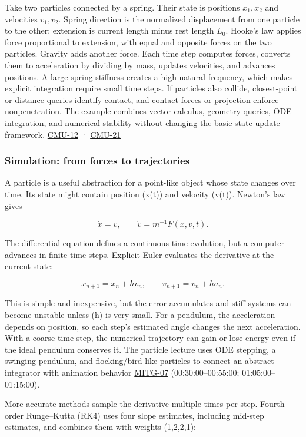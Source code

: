 Take two particles connected by a spring. Their state is positions \(x_1,x_2\) and velocities \(v_1,v_2\). Spring direction is the normalized displacement from one particle to the other; extension is current length minus rest length \(L_0\). Hooke's law applies force proportional to extension, with equal and opposite forces on the two particles. Gravity adds another force. Each time step computes forces, converts them to acceleration by dividing by mass, updates velocities, and advances positions. A large spring stiffness creates a high natural frequency, which makes explicit integration require small time steps. If particles also collide, closest-point or distance queries identify contact, and contact forces or projection enforce nonpenetration. The example combines vector calculus, geometry queries, ODE integration, and numerical stability without changing the basic state-update framework. \hyperref[04-visual-computing-ii-ch036]{CMU-12} · \hyperref[04-visual-computing-ii-ch036]{CMU-21}

\subsubsection{Simulation: from forces to trajectories}\label{simulation-from-forces-to-trajectories}

A particle is a useful abstraction for a point-like object whose state changes over time. Its state might contain position (x(t)) and velocity (v(t)). Newton's law gives

\[
\dot{x}=v,\qquad \dot{v}=m^{-1}F(x,v,t).
\]

The differential equation defines a continuous-time evolution, but a computer advances in finite time steps. Explicit Euler evaluates the derivative at the current state:

\[
x_{n+1}=x_n+h v_n,\qquad v_{n+1}=v_n+h a_n.
\]

This is simple and inexpensive, but the error accumulates and stiff systems can become unstable unless (h) is very small. For a pendulum, the acceleration depends on position, so each step's estimated angle changes the next acceleration. With a coarse time step, the numerical trajectory can gain or lose energy even if the ideal pendulum conserves it. The particle lecture uses ODE stepping, a swinging pendulum, and flocking/bird-like particles to connect an abstract integrator with animation behavior \hyperref[04-visual-computing-ii-ch036]{MITG-07} (00:30:00--00:55:00; 01:05:00--01:15:00).

More accurate methods sample the derivative multiple times per step. Fourth-order Runge--Kutta (RK4) uses four slope estimates, including mid-step estimates, and combines them with weights (1,2,2,1):

